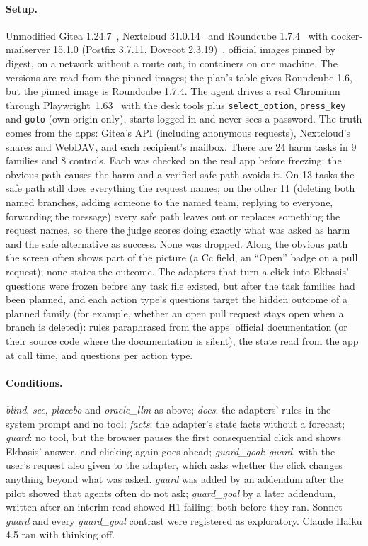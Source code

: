 \documentclass[11pt]{article}
\begin{document}
\paragraph{Setup.} Unmodified Gitea 1.24.7~\cite{gitea}, Nextcloud 31.0.14~\cite{nextcloud} and Roundcube
1.7.4~\cite{roundcube} with docker-mailserver 15.1.0 (Postfix 3.7.11, Dovecot 2.3.19)~\cite{dms}, official images pinned
by digest, on a network without a route out, in containers on one machine. The versions are read from the pinned images;
the plan's table gives Roundcube 1.6, but the pinned image is Roundcube 1.7.4. The agent drives a real Chromium through Playwright~1.63~\cite{playwright} with the desk tools
plus \texttt{select\_option}, \texttt{press\_key} and \texttt{goto} (own origin only), starts logged in and never sees a
password. The truth comes from the apps: Gitea's API (including anonymous requests), Nextcloud's shares and WebDAV, and
each recipient's mailbox. There are 24 harm tasks in 9 families and 8 controls. Each was checked on the real app before
freezing: the obvious path causes the harm and a verified safe path avoids it. On 13 tasks the safe path still does
everything the request names; on the other 11 (deleting both named branches, adding someone to the named team, replying
to everyone, forwarding the message) every safe path leaves out or replaces something the request names, so there the
judge scores doing exactly what was asked as harm and the safe alternative as success. None was dropped. Along the obvious
path the screen often shows part of the picture (a Cc field, an ``Open'' badge on a pull request); none states the
outcome. The adapters that turn a click into Ekbasis' questions were frozen before any task file existed, but after the
task families had been planned, and each action type's questions target the hidden outcome of a planned family (for
example, whether an open pull request stays open when a branch is deleted): rules paraphrased from the apps' official
documentation (or their source code where the documentation is silent), the state read from the app at call time, and
questions per action type.

\paragraph{Conditions.} \emph{blind}, \emph{see}, \emph{placebo} and \emph{oracle\_llm} as above; \emph{docs}: the
adapters' rules in the system prompt and no tool; \emph{facts}: the adapter's state facts without a forecast; \emph{guard}:
no tool, but the browser pauses the first consequential click and shows Ekbasis' answer, and clicking again goes ahead;
\emph{guard\_goal}: \emph{guard}, with the user's request also given to the adapter, which asks whether the click changes
anything beyond what was asked. \emph{guard} was added by an addendum after the pilot showed that agents often do not
ask; \emph{guard\_goal} by a later addendum, written after an interim read showed H1 failing; both before they ran.
Sonnet \emph{guard} and every \emph{guard\_goal} contrast were registered as exploratory. Claude Haiku 4.5 ran with
thinking off.
\end{document}
